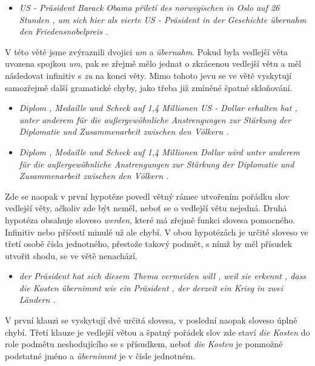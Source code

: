 \documentclass[12pt,a4paper]{report}
\begin{document}
\begin{itemize}
\item{\textit{US - Präsident Barack Obama přiletí des norwegischen in Oslo auf 26 Stunden , {\color{red}um} sich hier als vierte US - Präsident in der Geschichte {\color{red}übernahm} den Friedensnobelpreis .}}
\end{itemize}


V této větě jsme zvýraznili dvojici \textit{um} a \textit{übernahm}. Pokud byla vedlejší věta uvozena spojkou \textit{um}, pak se zřejmě mělo jednat o zkrácenou vedlejší větu a měl následovat infinitiv s \textit{zu} na konci věty. Mimo tohoto jevu se ve větě vyskytují samozřejmě další gramatické chyby, jako třeba již zmíněné špatné skloňování.

\begin{itemize}
\item{\textit{Diplom , Medaille und Scheck auf 1,4 Millionen US - Dollar {\color{red}erhalten hat} , unter anderem für die außergewöhnliche Anstrengungen zur Stärkung der Diplomatie und Zusammenarbeit zwischen den Völkern .}}
\item{\textit{Diplom , Medaille und Scheck auf 1,4 Millionen Dollar {\color{red}wird} unter anderem für die außergewöhnliche Anstrengungen zur Stärkung der Diplomatie und Zusammenarbeit zwischen den Völkern .}}
\end{itemize}

Zde se naopak v první hypotéze povedl větný rámec utvořením pořádku slov vedlejší věty, ačkoliv zde být neměl, neboť se o vedlejší větu nejedná. Druhá hypotéza obsahuje sloveso \textit{werden}, které má zřejmě funkci slovesa pomocného. Infinitiv nebo příčestí minulé už ale chybí. V obou hypotézách je určité sloveso ve třetí osobě čísla jednotného, přestože takový podmět, s nímž by měl přísudek utvořit shodu, se ve větě nenachází.

\begin{itemize}
\item{\textit{der Präsident {\color{red}hat} sich diesem Thema vermeiden {\color{red}will} , weil sie erkennt , dass die Kosten {\color{red}übernimmt} wie ein Präsident , der derzeit ein Krieg in zwei Ländern .}}
\end{itemize}

V první klauzi se vyskytují dvě určitá slovesa, v poslední naopak sloveso úplně chybí. Třetí klauze je vedlejší větou a špatný pořádek slov zde staví \textit{die Kosten} do role podmětu neshodujícího se s přísudkem, neboť \textit{die Kosten} je pomnožné podstatné jméno a \textit{übernimmt} je v čísle jednotném.
\end{document}
